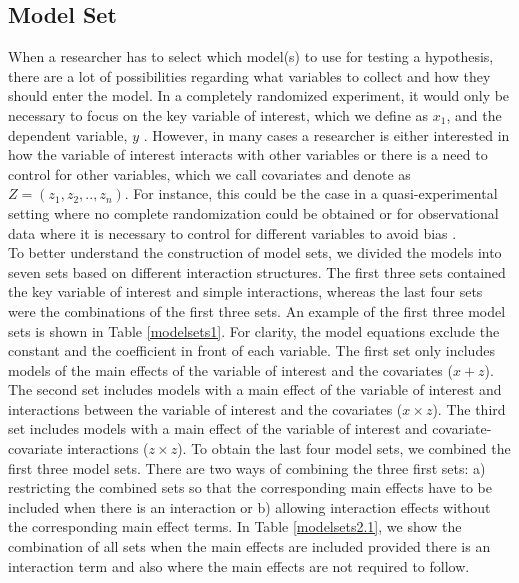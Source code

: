 \subsection{Model Set}
When a researcher has to select which model(s) to use for testing a hypothesis, there are a lot of possibilities regarding what variables to collect and how they should enter the model. In a completely randomized experiment, it would only be necessary to focus on the key variable of interest, which we define as $x_1$, and the dependent variable, $y$ \citep{angrist2008mostly}. However, in many cases a researcher is either interested in how the variable of interest interacts with other variables or there is a need to control for other variables, which we call covariates and denote as $Z=(z_1,z_2,..,z_n)$. For instance, this could be the case in a quasi-experimental setting where no complete randomization could be obtained or for observational data where it is necessary to control for different variables to avoid bias \citep{angrist2008mostly}. \\ 
To better understand the construction of model sets, we divided the models into seven sets based on different interaction structures. The first three sets contained the key variable of interest and simple interactions, whereas the last four sets were the combinations of the first three sets. An example of the first three model sets is shown in Table \ref{modelsets1}. For clarity, the model equations exclude the constant and the coefficient in front of each variable. The first set only includes models of the main effects of the variable of interest and the covariates ($x + z$). The second set includes models with a main effect of the variable of interest and interactions between the variable of interest and the covariates ($x \times z$). The third set includes models with a main effect of the variable of interest and covariate-covariate interactions ($z \times z$).
To obtain the last four model sets, we combined the first three model sets. There are two ways of combining the three first sets: a) restricting the combined sets so that the corresponding main effects have to be included when there is an interaction or b) allowing interaction effects without the corresponding main effect terms. In Table \ref{modelsets2.1}, we show the combination of all sets when the main effects are included provided there is an interaction term and also where the main effects are not required to follow. \\
 



